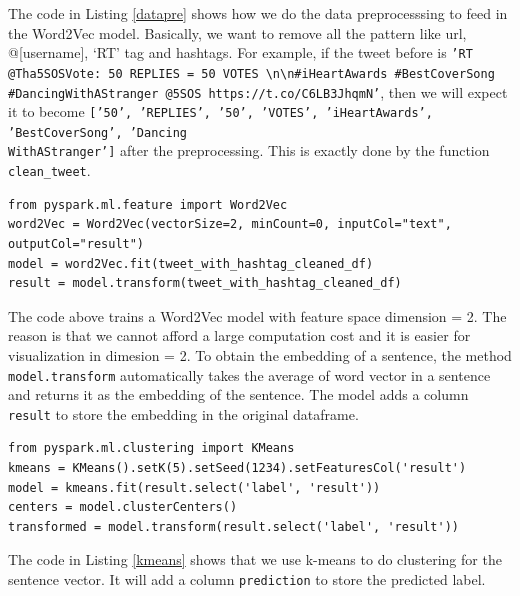 The code in Listing \ref{datapre} shows how we do the data preprocesssing to feed in the Word2Vec model. Basically, we want to remove all the pattern like url, @[username], `RT' tag and hashtags. For example, if the tweet before is \texttt{'RT @Tha5SOSVote: 50 REPLIES = 50 VOTES \textbackslash n\textbackslash n\#iHeartAwards \#BestCoverSong \#DancingWithAStranger @5SOS https://t.co/C6LB3JhqmN'}, then we will expect it to become \texttt{['50', 'REPLIES', '50', 'VOTES', 'iHeartAwards', 'BestCoverSong', 'Dancing\\WithAStranger']} after the preprocessing. This is exactly done by the function \texttt{clean\_tweet}.

\begin{minipage}{16cm}
\begin{lstlisting}[caption=Training Word2Vec, label={w2v}]
from pyspark.ml.feature import Word2Vec
word2Vec = Word2Vec(vectorSize=2, minCount=0, inputCol="text", outputCol="result")
model = word2Vec.fit(tweet_with_hashtag_cleaned_df)
result = model.transform(tweet_with_hashtag_cleaned_df)
\end{lstlisting}
\end{minipage}

The code above trains a Word2Vec model with feature space dimension = 2. The reason is that we cannot afford a large computation cost and it is easier for visualization in dimesion = 2. To obtain the embedding of a sentence, the method \texttt{model.transform} automatically takes the average of word vector in a sentence and returns it as the embedding of the sentence. The model adds a column \texttt{result} to store the embedding in the original dataframe.

\begin{lstlisting}[caption=K-means Clustering, label={kmeans}]
from pyspark.ml.clustering import KMeans
kmeans = KMeans().setK(5).setSeed(1234).setFeaturesCol('result')
model = kmeans.fit(result.select('label', 'result'))
centers = model.clusterCenters()
transformed = model.transform(result.select('label', 'result'))
\end{lstlisting}

The code in Listing \ref{kmeans} shows that we use k-means to do clustering for the sentence vector. It will add a column \texttt{prediction} to store the predicted label.

